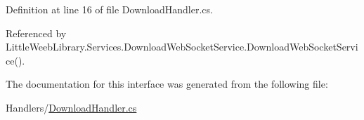 Definition at line 16 of file Download\+Handler.\+cs.



Referenced by Little\+Weeb\+Library.\+Services.\+Download\+Web\+Socket\+Service.\+Download\+Web\+Socket\+Service().



The documentation for this interface was generated from the following file\+:\begin{DoxyCompactItemize}
\item 
Handlers/\mbox{\hyperlink{_download_handler_8cs}{Download\+Handler.\+cs}}\end{DoxyCompactItemize}

